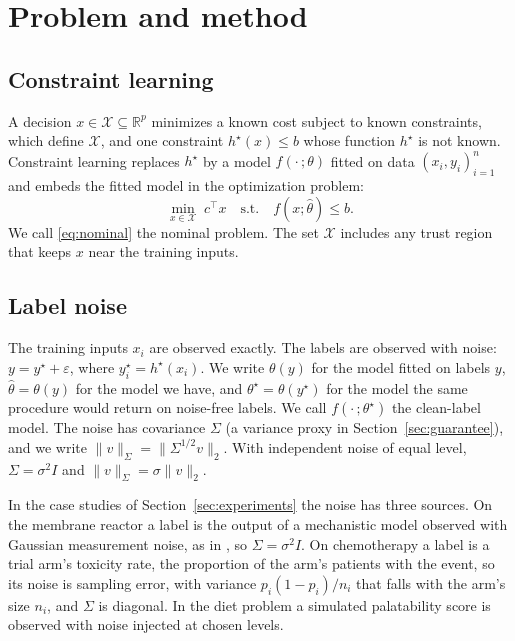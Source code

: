 \section{Problem and method}\label{sec:method}

\subsection{Constraint learning}
A decision $x \in \mathcal{X} \subseteq \mathbb{R}^p$ minimizes a known cost
subject to known constraints, which define $\mathcal{X}$, and one constraint
$h^\star(x) \le b$ whose function $h^\star$ is not known. Constraint learning
\citep{fajemisin2024optimization, maragno2025mixed} replaces $h^\star$ by a
model $f(\cdot\,;\theta)$ fitted on data $(x_i, y_i)_{i=1}^n$ and embeds the
fitted model in the optimization problem:
\begin{equation}\label{eq:nominal}
  \min_{x \in \mathcal{X}} \; c^\top x
  \quad\text{s.t.}\quad f(x;\hat\theta) \le b .
\end{equation}
We call \eqref{eq:nominal} the nominal problem. The set $\mathcal{X}$ includes
any trust region that keeps $x$ near the training inputs.

\subsection{Label noise}
The training inputs $x_i$ are observed exactly. The labels are observed with
noise: $y = y^\star + \varepsilon$, where $y^\star_i = h^\star(x_i)$. We write
$\theta(y)$ for the model fitted on labels $y$, $\hat\theta = \theta(y)$ for
the model we have, and $\theta^\star = \theta(y^\star)$ for the model the same
procedure would return on noise-free labels. We call $f(\cdot\,;\theta^\star)$
the clean-label model. The noise has covariance $\Sigma$ (a variance proxy in
Section~\ref{sec:guarantee}), and we write $\|v\|_\Sigma = \|\Sigma^{1/2}v\|_2$.
With independent noise of equal level, $\Sigma = \sigma^2 I$ and
$\|v\|_\Sigma = \sigma\|v\|_2$.

In the case studies of Section~\ref{sec:experiments} the noise has three
sources. On the membrane reactor a label is the output of a mechanistic model
observed with Gaussian measurement noise, as in \citet{ovalle2025cmicl}, so
$\Sigma = \sigma^2 I$. On chemotherapy a label is a trial arm's toxicity rate,
the proportion of the arm's patients with the event, so its noise is sampling
error, with variance $p_i(1-p_i)/n_i$ that falls with the arm's size $n_i$,
and $\Sigma$ is diagonal. In the diet problem a simulated palatability score
is observed with noise injected at chosen levels.

